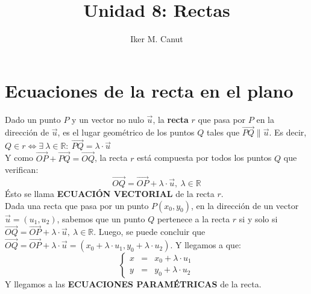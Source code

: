 \documentclass[11pt,a4paper]{article}
\author{Iker M. Canut}
\title{Unidad 8: Rectas}
\begin{document}
\maketitle
\newpage

\section{Ecuaciones de la recta en el plano}
Dado un punto $P$ y un vector no nulo $\overrightarrow{u}$, la \textbf{recta} $r$ que pasa por $P$ en la direcci\'on de $\overrightarrow{u}$, es el lugar geom\'etrico de los puntos $Q$ tales que $\overrightarrow{PQ} \parallel \overrightarrow{u}$. Es decir, $Q \in r \iff \exists\ \lambda \in \mathbb{R} :\ \overrightarrow{PQ} = \lambda \cdot \overrightarrow{u}$\\
\noindent Y como $\overrightarrow{OP} + \overrightarrow{PQ} = \overrightarrow{OQ}$, la recta $r$ est\'a compuesta por todos los puntos $Q$ que verifican: 
\begin{equation}
\overrightarrow{OQ} = \overrightarrow{OP} + \lambda \cdot \overrightarrow{u},\ \lambda \in \mathbb{R}
\end{equation}
\'Esto se llama \textbf{ECUACI\'ON VECTORIAL} de la recta $r$.\\

Dada una recta que pasa por un punto $P(x_0, y_0)$, en la direcci\'on de un vector $\overrightarrow{u}=(u_1,u_2)$, sabemos que un punto $Q$ pertenece a la recta $r$ si y solo si $\overrightarrow{OQ} = \overrightarrow{OP} + \lambda \cdot \overrightarrow{u},\ \lambda \in \mathbb{R}$. Luego, se puede concluir que $\overrightarrow{OQ} = \overrightarrow{OP} + \lambda \cdot \overrightarrow{u} = (x_0 + \lambda \cdot u_1, y_0+\lambda\cdot u_2)$. Y llegamos a que:
\begin{equation}
\left\{\begin{array}{lll}
x & = & x_0 + \lambda \cdot u_1\\
y & = & y_0 + \lambda \cdot u_2
\end{array}\right.
\end{equation}
Y llegamos a las \textbf{ECUACIONES PARAM\'ETRICAS} de la recta.\\
\end{document}
